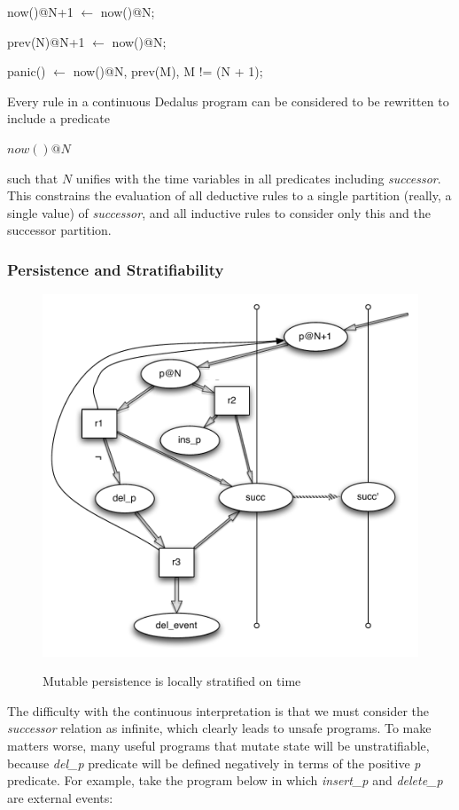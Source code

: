 \begin{Dedalus}
now()@N+1  \(\leftarrow\)
    now()@N;

prev(N)@N+1  \(\leftarrow\)
    now()@N;

panic()  \(\leftarrow\)
    now()@N,
    prev(M),
    M != (N + 1);
\end{Dedalus}

Every rule in a continuous Dedalus program can be considered to be rewritten to include a predicate

$now()@N$

such that $N$ unifies with the time variables in all predicates including \emph{successor}.  This constrains the evaluation of all deductive 
rules to a single partition (really, a single value) of \emph{successor}, and all inductive rules to consider only this and the successor partition.

\subsubsection{Persistence and Stratifiability}

\begin{figure}[t]
  \centering
  \includegraphics[width=0.75\linewidth]{localstrat_rgg.pdf}
  \label{fig:lstrat}
  \caption{Mutable persistence is locally stratified on time}
\vspace{-8pt}
\end{figure}


The difficulty with the continuous interpretation is that we must consider the \emph{successor} relation as infinite, which clearly leads
to unsafe programs.  To make matters worse, many useful programs that mutate state will be unstratifiable, because \emph{del\_p} predicate
will be defined negatively in terms of the positive \emph{p} predicate.  For example, take the program below in which \emph{insert\_p}
and \emph{delete\_p} are external events:

